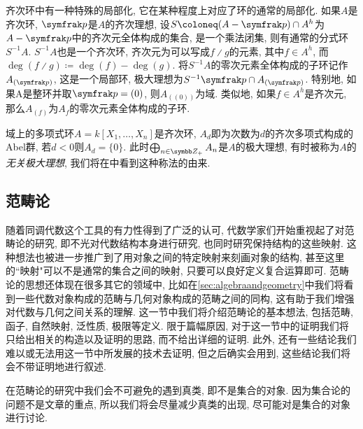齐次环中有一种特殊的局部化, 它在某种程度上对应了环的通常的局部化. 如果$A$是齐次环, $\ideal{p}$是$A$的齐次理想, 设$S\coloneq (A-\ideal{p})\cap A^h$为$A-\ideal{p}$中的齐次元全体构成的集合, 是一个乘法闭集, 则有通常的分式环$S^{-1}A$. $S^{-1}A$也是一个齐次环, 齐次元为可以写成$f{\divslash}g$的元素, 其中$f\in A^h$, 而$\deg (f{\divslash}g)\coloneq \deg (f)-\deg (g)$. 将$S^{-1}A$的零次元素全体构成的子环记作$A_{(\ideal{p})}$, 这是一个局部环, 极大理想为$S^{-1}\ideal{p}\cap A_{(\ideal{p})}$. 特别地, 如果A是整环并取$\ideal{p}=(0)$, 则$A_{((0))}$为域. 类似地, 如果$f\in A^h$是齐次元, 那么$A_{(f)}$为$A_f$的零次元素全体构成的子环.

\begin{example}
  域上的多项式环$A=k[X_1, \dotsc, X_n]$是齐次环, $A_d$即为次数为$d$的齐次多项式构成的Abel群, 若$d<0$则$A_d=\{0\}$. 此时$\bigoplus_{n\in\ZZ_+}A_n$是$A$的极大理想, 有时被称为$A$的\emph{无关极大理想}, 我们将在中看到这种称法的由来.
\end{example}


\subsection{范畴论}\label{subsec:algebra-category}

随着同调代数这个工具的有力性得到了广泛的认可, 代数学家们开始重视起了对范畴论的研究, 即不光对代数结构本身进行研究, 也同时研究保持结构的这些映射. 这种想法也被进一步推广到了用对象之间的特定映射来刻画对象的结构, 甚至这里的``映射"可以不是通常的集合之间的映射, 只要可以良好定义复合运算即可. 范畴论的思想还体现在很多其它的领域中, 比如在\ref{sec:algebraandgeometry}中我们将看到一些代数对象构成的范畴与几何对象构成的范畴之间的同构, 这有助于我们增强对代数与几何之间关系的理解. 这一节中我们将介绍范畴论的基本想法, 包括范畴, 函子, 自然映射, 泛性质, 极限等定义. 限于篇幅原因, 对于这一节中的证明我们将只给出相关的构造以及证明的思路, 而不给出详细的证明. 此外, 还有一些结论我们难以或无法用这一节中所发展的技术去证明, 但之后确实会用到, 这些结论我们将会不带证明地进行叙述.

在范畴论的研究中我们会不可避免的遇到真类, 即不是集合的对象. 因为集合论的问题不是文章的重点, 所以我们将会尽量减少真类的出现, 尽可能对是集合的对象进行讨论.

